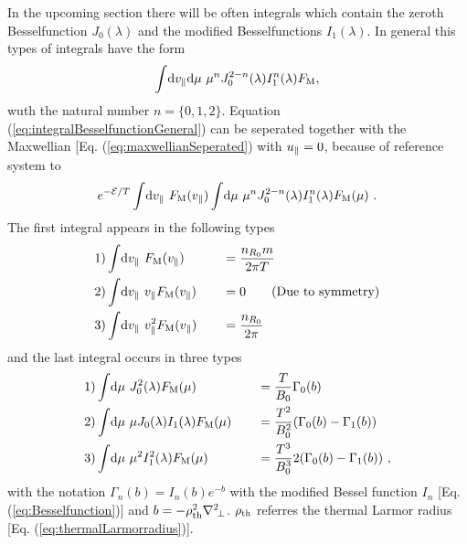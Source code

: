 In the upcoming section there will be often integrals which contain the zeroth Besselfunction $J_0(\lambda)$ and the modified Besselfunctions $I_1(\lambda)$. In general this types of integrals have the form
\begin{gather}
	\int \! \mathrm{d}v_\parallel\mathrm{d}\mu~ \mu^n J_0^{2-n}(\lambda) I_1^n(\lambda) F_\mathrm{M} ,
	\label{eq:integralBesselfunctionGeneral}
\end{gather}
wuth the natural number $n = \{0, 1, 2\}$. Equation (\ref{eq:integralBesselfunctionGeneral}) can be seperated together with the Maxwellian [Eq. (\ref{eq:maxwellianSeperated}) with $u_\parallel = 0$, because of reference system to
\begin{gather}
	e^{-\mathcal{E}/T} \int \! \mathrm{d}v_\parallel ~ F_\mathrm{M}(v_\parallel) \int \! \mathrm{d}\mu ~ \mu^n J_0^{2-n}(\lambda) I_1^n(\lambda) F_\mathrm{M}(\mu) ~.
	\label{eq:integralBesselfunctionGeneralSperated}
\end{gather}
The first integral appears in the following types
\begin{gather}
	\begin{aligned}
		1)& \int \! \mathrm{d}v_\parallel ~         F_\mathrm{M}(v_\parallel) &\quad &= \frac{n_{R_0} m}{2\pi T} \\
		2)& \int \! \mathrm{d}v_\parallel ~ v_\parallel   F_\mathrm{M}(v_\parallel) &\quad &= 0 \qquad \mathrm{(Due~to~symmetry)}\\
		3)& \int \! \mathrm{d}v_\parallel ~ v_\parallel^2 F_\mathrm{M}(v_\parallel) &\quad &= \frac{n_{R_0}}{2\pi} \\
	\end{aligned}
	\label{eq:integralMaxwellian}
\end{gather}
and the last integral occurs in three types
\begin{gather}
	\begin{aligned}
		1)& \int \! \mathrm{d}\mu ~ J_0^2(\lambda) F_\mathrm{M}(\mu) &\quad &= \frac{T}{B_0} \Gamma_0(b) \\
		2)& \int \! \mathrm{d}\mu ~ \mu J_0(\lambda) I_1(\lambda) F_\mathrm{M}(\mu) &\quad &= \frac{T^2}{B_0^2} (\Gamma_0(b) - \Gamma_1(b)) \\
		3)& \int \! \mathrm{d}\mu ~ \mu^2 I_1^2(\lambda) F_\mathrm{M}(\mu) &\quad &= \frac{T^3}{B_0^3} 2 (\Gamma_0(b) - \Gamma_1(b))~, \\
	\end{aligned}
	\label{eq:integralBesselfunction}
\end{gather}
with the notation $\Gamma_n(b) = I_n(b) e^{-b}$ with the modified Bessel function $I_n$ [Eq. (\ref{eq:Besselfunction})] and $b= - \rho_{\mathrm{th}}^2 \nabla^2\!_\perp$. $\rho_{\mathrm{th}}$ referres the thermal Larmor radius [Eq. (\ref{eq:thermalLarmorradius})]. \cite{GKWDerivation}

\newpage

